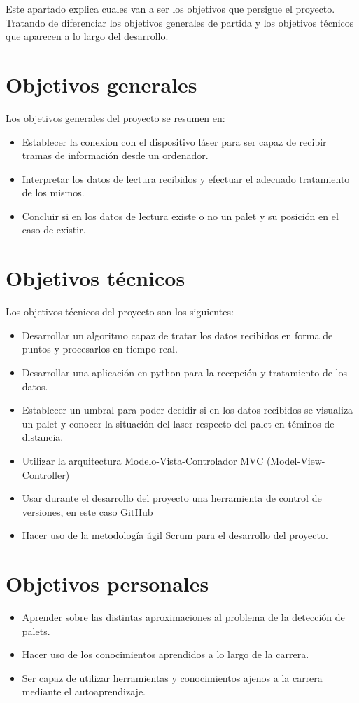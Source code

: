 
Este apartado explica cuales van a ser los objetivos que persigue el proyecto. Tratando de diferenciar los objetivos generales de partida y los objetivos técnicos que aparecen a lo largo del desarrollo.

\section{Objetivos generales}
Los objetivos generales del proyecto se resumen en:
\begin{itemize}
	\item Establecer la conexion con el dispositivo láser para ser capaz de recibir tramas de información desde un ordenador.
	\item Interpretar los datos de lectura recibidos y efectuar el adecuado tratamiento de los mismos.
	\item Concluir si en los datos de lectura existe o no un palet y su posición en el caso de existir.
\end{itemize}

\section{Objetivos técnicos}
Los objetivos técnicos del proyecto son los siguientes:
\begin{itemize}
	\item Desarrollar un algoritmo capaz de tratar los datos recibidos en forma de puntos y procesarlos en tiempo real.
	\item Desarrollar una aplicación en python para la recepción y tratamiento de los datos.
	\item Establecer un umbral para poder decidir si en los datos recibidos se visualiza un palet y conocer la situación del laser respecto del palet en téminos de distancia.
	\item Utilizar la arquitectura Modelo-Vista-Controlador MVC (Model-View-Controller)
	\item Usar durante el desarrollo del proyecto una herramienta de control de versiones, en este caso GitHub
	\item Hacer uso de la metodología ágil Scrum para el desarrollo del proyecto.
\end{itemize}

\section{Objetivos personales}
\begin{itemize}
\item Aprender sobre las distintas aproximaciones al problema de la detección de palets.
\item Hacer uso de los conocimientos aprendidos a lo largo de la carrera.
\item Ser capaz de utilizar herramientas y conocimientos ajenos a la carrera mediante el autoaprendizaje.
\end{itemize}


